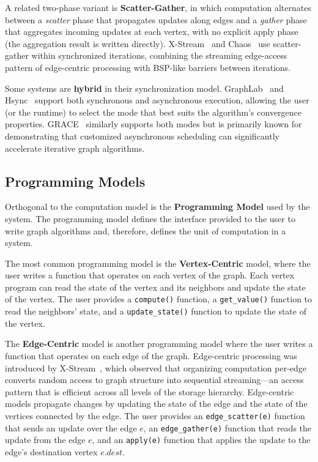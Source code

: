 A related two-phase variant is \textbf{Scatter-Gather}, in which computation alternates between a \emph{scatter} phase that propagates updates along edges and a \emph{gather} phase that aggregates incoming updates at each vertex, with no explicit apply phase (the aggregation result is written directly).
X-Stream~\cite{roy2013x} and Chaos~\cite{royChaos2015} use scatter-gather within synchronized iterations, combining the streaming edge-access pattern of edge-centric processing with BSP-like barriers between iterations.

Some systems are \textbf{hybrid} in their synchronization model.
GraphLab~\cite{low2014graphlab} and Hsync~\cite{Xie2015Hsync} support both synchronous and asynchronous execution, allowing the user (or the runtime) to select the mode that best suits the algorithm's convergence properties.
GRACE~\cite{wang2013asynchronous} similarly supports both modes but is primarily known for demonstrating that customized asynchronous scheduling can significantly accelerate iterative graph algorithms.

\subsection{Programming Models}
\label{design:prog_models}

Orthogonal to the computation model is the \textbf{Programming Model} used by the system.
The programming model defines the interface provided to the user to write graph algorithms and, therefore, defines the unit of computation in a system.

The most common programming model is the \textbf{Vertex-Centric} model, where the user writes a function that operates on each vertex of the graph.
Each vertex program can read the state of the vertex and its neighbors and update the state of the vertex.
The user provides a \texttt{compute()} function, a \texttt{get\_value()} function to read the neighbors' state, and a \texttt{update\_state()} function to update the state of the vertex.

The \textbf{Edge-Centric} model is another programming model where the user writes a function that operates on each edge of the graph.
Edge-centric processing was introduced by X-Stream~\cite{roy2013x}, which observed that organizing computation per-edge converts random access to graph structure into sequential streaming---an access pattern that is efficient across all levels of the storage hierarchy.
Edge-centric models propagate changes by updating the state of the edge and the state of the vertices connected by the edge.
The user provides an \texttt{edge\_scatter(e)} function that sends an update over the edge $e$, an \texttt{edge\_gather(e)} function that reads the update from the edge $e$, and an \texttt{apply(e)} function that applies the update to the edge's destination vertex $e.dest$.

